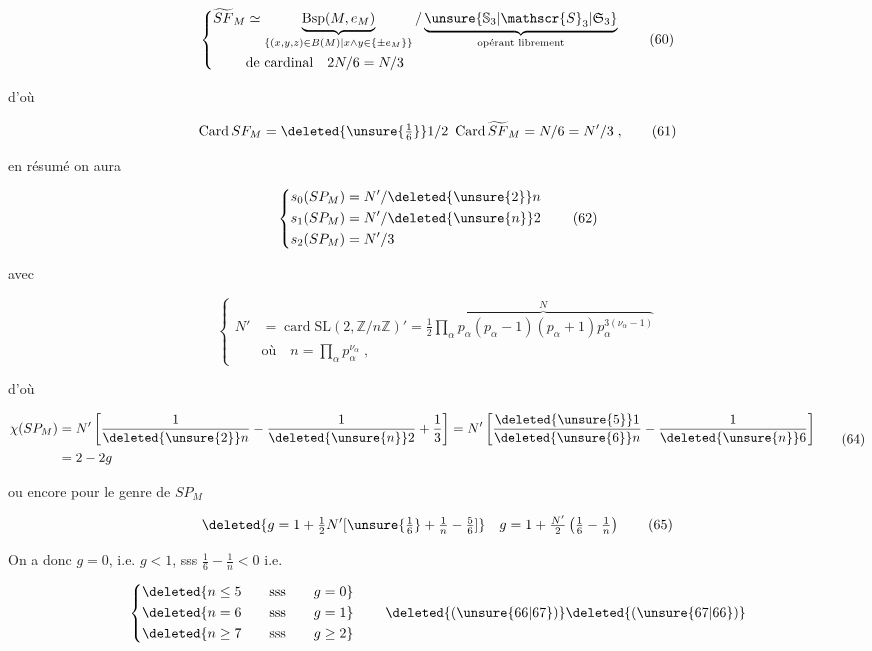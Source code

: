 

\[
\left\{\begin{aligned}
\widetilde{SF}_M&\simeq\underbrace{\mathrm{Bsp}(M,e_M)}_{\{(x,y,z)\in B(M)\mid x\wedge y\in\{\pm e_M\}\}}/
\underbrace{\unsure{\mathbb{S}_3|\mathscr{S}_3|\mathfrak{S}_3}}_{\text{opérant librement}}\\
&\text{de cardinal}\quad 2N/6=N/3
\end{aligned}\right.\tag*{(60)}
\]

d'où

\[
\operatorname{Card}SF_M=\deleted{\unsure{\tfrac16}}1/2\ \operatorname{Card}\widetilde{SF}_M=N/6=N'/3\;,\tag*{(61)}
\]

en résumé on aura

\[
\left\{\begin{aligned}
s_0(SP_M)&=N'/\deleted{\unsure{2}}n\\
s_1(SP_M)&=N'/\deleted{\unsure{n}}2\\
s_2(SP_M)&=N'/3
\end{aligned}\right.\tag*{(62)}
\]


avec

\[
\left\{\begin{aligned}
N'&=\operatorname{card}\mathrm{SL}(2,\mathbb{Z}/n\mathbb{Z})'=\tfrac12\overbrace{\prod_\alpha p_\alpha(p_\alpha-1)(p_\alpha+1)p_\alpha^{3(\nu_\alpha-1)}}^N\\
&\text{où}\quad n=\prod_\alpha p_\alpha^{\nu_\alpha}\;,
\end{aligned}\right.\tag*{(63)}
\]

d'où

\[
\begin{aligned}
\chi(SP_M)&=N'\left[\frac1{\deleted{\unsure{2}}n}-\frac1{\deleted{\unsure{n}}2}+\frac13\right]=N'\left[\frac{\deleted{\unsure{5}}1}{\deleted{\unsure{6}}n}-\frac1{\deleted{\unsure{n}}6}\right]\\
&=2-2g
\end{aligned}\tag*{(64)}
\]

ou encore pour le genre de $SP_M$

\[
\deleted{g=1+\tfrac12N'[\unsure{\tfrac16}+\tfrac1n-\tfrac56]}\quad
g=1+\tfrac{N'}2\left(\tfrac16-\tfrac1n\right)\tag*{(65)}
\]

On a donc $g=0$, i.e. $g<1$, sss   $\frac16-\frac1n<0$ i.e. 

\[
\left\{\begin{aligned}
&\deleted{n\leq5\qquad\text{sss}\qquad g=0}\\
&\deleted{n=6\qquad\text{sss}\qquad g=1}\\
&\deleted{n\geq7\qquad\text{sss}\qquad g\geq2}
\end{aligned}\right.\tag*{\deleted{(\unsure{66|67})}\deleted{(\unsure{67|66})}}
\]

